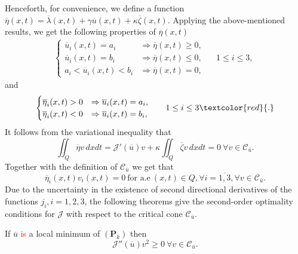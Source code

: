 \documentclass[reqno]{amsart}
\begin{document}
	Henceforth, for convenience, we define a function $\overline{\eta}(x,t)=\overline{\lambda}(x,t) + \gamma \overline{u}(x,t) + \kappa \overline{\zeta}(x,t).$ Applying the above-mentioned results, we get the following properties of $\overline{\eta}(x,t)$
	\begin{equation} \label{eta_1}
		\begin{aligned}
			\begin{cases}
				\overline{u}_i(x,t)=a_i &\Rightarrow  \overline{\eta}(x,t) \geq 0, \\
				\overline{u}_i(x,t) =b_i &\Rightarrow \overline{\eta}(x,t) \leq 0, \hspace{20pt} 1\leq i \leq 3, \\
				a_i  < \overline{u}_i(x,t) < b_i &\Rightarrow \overline{\eta}(x,t) =0,
			\end{cases}
		\end{aligned}
	\end{equation}
	and 
	\begin{equation} \label{eta_2}
		\begin{aligned}
			\begin{cases}
				\overline{\eta}_i(x,t) > 0 &\Rightarrow \overline{u}_i(x,t) = a_i, \\
				\overline{\eta}_i(x,t)<0 &\Rightarrow \overline{u}_i(x,t) =b_i,
			\end{cases} 
		\end{aligned} \hspace{20pt} 1\leq i \leq 3 \textcolor{red}{.}
	\end{equation}
	It follows from the variational inequality that 
	\begin{equation*}
		\iint_Q \overline{\eta}v \, dxdt = \mathcal{J}'(\overline{u})v + \kappa \iint_Q \overline{\zeta}v \, dxdt = 0 \ \forall v\in \mathcal{C}_{\overline{u}}.
	\end{equation*}
	Together with the definition of $\mathcal{C}_{\overline{u}}$ we get that
	\begin{equation} \label{eta_3}
		\overline{\eta}_i(x,t)v_i(x,t) = 0 \ \text{for a.e} \ (x,t)\in Q, \forall i = \overline{1,3}, \forall v\in \mathcal{C}_{\overline{u}}.
	\end{equation}
	Due to the uncertainty in the existence of second directional derivatives of the functions $j_i, i =1,2,3$, the following theorems give the second-order optimality conditions for $\mathcal{J}$ with respect to the critical cone $\mathcal{C}_{\overline{u}}$.
	\begin{theorem} \label{theo_snc}
		If $\overline{u}$ \textcolor{red}{is} a local minimum of $(\textbf{P}_k)$ then
		\begin{equation} \label{snc}
			\mathcal{J}''(\overline{u})v^2 \geq 0 \ \forall v\in \mathcal{C}_{\overline{u}}.
		\end{equation}
	\end{theorem}
\end{document}
